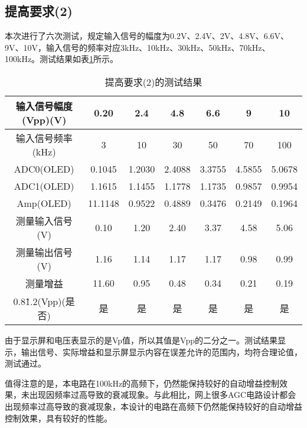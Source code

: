 \documentclass[lang=cn,11pt,a4paper]{elegantpaper}
\begin{document}
\subsection{提高要求(2)}
本次进行了六次测试，规定输入信号的幅度为0.2V、2.4V、2V、4.8V、6.6V、9V、10V，输入信号的频率对应3kHz、10kHz、30kHz、50kHz、70kHz、100kHz。测试结果如表\ref{tab:4_2}所示。

\begin{table}[!ht]
  \centering
  \caption{提高要求(2)的测试结果}
  \begin{tabular}{ccccccc}
    \textbf{输入信号幅度(Vpp)(V)} & \textbf{0.20} & \textbf{2.4} & \textbf{4.8} & \textbf{6.6} & \textbf{9} & \textbf{10} \\ \hline
    输入信号频率(kHz)             & 3             & 10           & 30           & 50           & 70         & 100         \\
    ADC0(OLED)              & 0.1045        & 1.2030       & 2.4088       & 3.3755       & 4.5855     & 5.0678      \\
    ADC1(OLED)              & 1.1615        & 1.1455       & 1.1778       & 1.1735       & 0.9857     & 0.9954      \\
    Amp(OLED)               & 11.1148       & 0.9522       & 0.4889       & 0.3476       & 0.2149     & 0.1964      \\
    测量输入信号(V)               & 0.10          & 1.20         & 2.40         & 3.37         & 4.58       & 5.06        \\
    测量输出信号(V)               & 1.16          & 1.14         & 1.17         & 1.17         & 0.98       & 0.99        \\
    测量增益                    & 11.60         & 0.95         & 0.48         & 0.34         & 0.21       & 0.19        \\
    0.8\~1.2(Vpp)(是否)       & 是             & 是            & 是            & 是            & 是          & 是           \\
  \end{tabular}
  \label{tab:4_2}
\end{table}
由于显示屏和电压表显示的是Vp值，所以其值是Vpp的二分之一。测试结果显示，输出信号、实际增益和显示屏显示内容在误差允许的范围内，均符合理论值，测试通过。

值得注意的是，本电路在100kHz的高频下，仍然能保持较好的自动增益控制效果，未出现因频率过高导致的衰减现象。与此相比，网上很多AGC电路设计都会出现频率过高导致的衰减现象，本设计的电路在高频下仍然能保持较好的自动增益控制效果，具有较好的性能。
\end{document}
